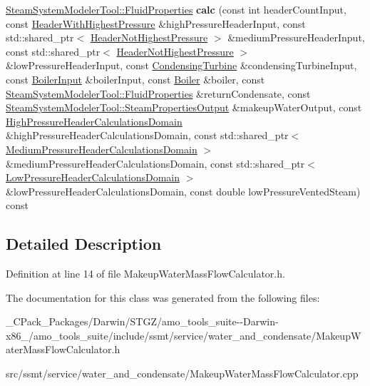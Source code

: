 \begin{DoxyCompactItemize}
\hyperlink{struct_steam_system_modeler_tool_1_1_fluid_properties}{Steam\+System\+Modeler\+Tool\+::\+Fluid\+Properties} {\bfseries calc} (const int header\+Count\+Input, const \hyperlink{class_header_with_highest_pressure}{Header\+With\+Highest\+Pressure} \&high\+Pressure\+Header\+Input, const std\+::shared\+\_\+ptr$<$ \hyperlink{class_header_not_highest_pressure}{Header\+Not\+Highest\+Pressure} $>$ \&medium\+Pressure\+Header\+Input, const std\+::shared\+\_\+ptr$<$ \hyperlink{class_header_not_highest_pressure}{Header\+Not\+Highest\+Pressure} $>$ \&low\+Pressure\+Header\+Input, const \hyperlink{class_condensing_turbine}{Condensing\+Turbine} \&condensing\+Turbine\+Input, const \hyperlink{class_boiler_input}{Boiler\+Input} \&boiler\+Input, const \hyperlink{class_boiler}{Boiler} \&boiler, const \hyperlink{struct_steam_system_modeler_tool_1_1_fluid_properties}{Steam\+System\+Modeler\+Tool\+::\+Fluid\+Properties} \&return\+Condensate, const \hyperlink{struct_steam_system_modeler_tool_1_1_steam_properties_output}{Steam\+System\+Modeler\+Tool\+::\+Steam\+Properties\+Output} \&makeup\+Water\+Output, const \hyperlink{class_high_pressure_header_calculations_domain}{High\+Pressure\+Header\+Calculations\+Domain} \&high\+Pressure\+Header\+Calculations\+Domain, const std\+::shared\+\_\+ptr$<$ \hyperlink{class_medium_pressure_header_calculations_domain}{Medium\+Pressure\+Header\+Calculations\+Domain} $>$ \&medium\+Pressure\+Header\+Calculations\+Domain, const std\+::shared\+\_\+ptr$<$ \hyperlink{class_low_pressure_header_calculations_domain}{Low\+Pressure\+Header\+Calculations\+Domain} $>$ \&low\+Pressure\+Header\+Calculations\+Domain, const double low\+Pressure\+Vented\+Steam) const
\end{DoxyCompactItemize}


\subsection{Detailed Description}


Definition at line 14 of file Makeup\+Water\+Mass\+Flow\+Calculator.\+h.



The documentation for this class was generated from the following files\+:\begin{DoxyCompactItemize}
\item 
\+\_\+\+C\+Pack\+\_\+\+Packages/\+Darwin/\+S\+T\+G\+Z/amo\+\_\+tools\+\_\+suite-\/-\/\+Darwin-\/x86\+\_/amo\+\_\+tools\+\_\+suite/include/ssmt/service/water\+\_\+and\+\_\+condensate/Makeup\+Water\+Mass\+Flow\+Calculator.\+h\item 
src/ssmt/service/water\+\_\+and\+\_\+condensate/Makeup\+Water\+Mass\+Flow\+Calculator.\+cpp\end{DoxyCompactItemize}
